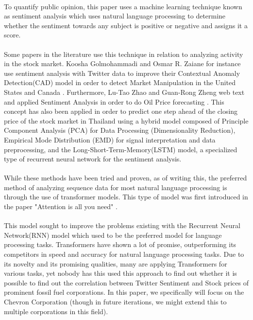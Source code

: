 \documentclass[12pt, letterpaper, titlepage]{article}
\begin{document}
\paragraph{}
	To quantify public opinion, this paper uses a machine learning technique known as sentiment analysis \citep{medhat2014sentiment} which uses natural language processing to determine whether the sentiment towards any subject is positive or negative and assigns it a score.
\paragraph{}
	 Some papers in the literature use this technique in relation to analyzing activity in the stock market. Koosha Golmohammadi and Osmar R. Zaiane for instance use sentiment analysis with Twitter data to improve their Contextual Anomaly Detection(CAD) model in order to detect Market Manipulation in the United States and Canada \citep{golmohammadi2017sentiment}. Furthermore, Lu-Tao Zhao and Guan-Rong Zheng web text and applied Sentiment Analysis in order to do Oil Price forecasting \citep{zhao2019forecasting}. This concept has also been applied in order to predict one step ahead of the closing price of the stock market in Thailand using a hybrid model composed of Principle Component Analysis (PCA) for Data Processing (Dimensionality Reduction), Empirical Mode Distribution (EMD) for signal interpretation and data preprocessing, and the Long-Short-Term-Memory(LSTM) model, a specialized type of recurrent neural network for the sentiment analysis. \citep{srijiranon2022hybrid}
\paragraph{}
	While these methods have been tried and proven, as of writing this, the preferred method of analyzing sequence data for most natural language processing is through the use of transformer models. This type of model was first introduced in the paper "Attention is all you need" \citep{vaswani2017attention}. 
\paragraph{}
	This model sought to improve the problems existing with the Recurrent Neural Network(RNN) model which used to be the preferred model for language processing tasks. Transformers have shown a lot of promise, outperforming its competitors in speed and accuracy for natural language processing tasks. Due to its novelty and its promising qualities, many are applying Transformers for various tasks, yet nobody has this used this approach to find out whether it is possible to find out the correlation between Twitter Sentiment and Stock prices of prominent fossil fuel corporations. In this paper, we specifically will focus on the Chevron Corporation (though in future iterations, we might extend this to multiple corporations in this field).
\end{document}

